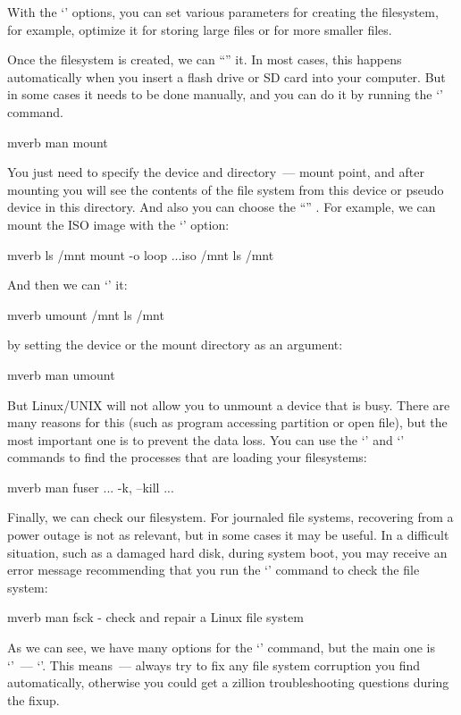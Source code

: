With the `' options, you can set various parameters for creating
the filesystem, for example, optimize it for storing large files or for more
smaller files.

Once the filesystem is created, we can ``'' it. In most cases,
this happens automatically when you insert a flash drive or SD card into
your computer. But in some cases it needs to be done manually, and you can do
it by running the `' command.
\begin{code}{mverb}
man mount
\end{code}
You just need to specify the device and directory~--- mount point, and
after mounting you will see the contents of the file system from this
device or pseudo device in this directory. And also you can choose
the ``'' . For example, we can mount
the ISO image with the `' option:
\begin{code}{mverb}
ls /mnt
mount -o loop ...iso /mnt
ls /mnt
\end{code}
And then we can `' it:
\begin{code}{mverb}
umount /mnt
ls /mnt
\end{code}
by setting the device or the mount directory as an argument:
\begin{code}{mverb}
man umount
\end{code}
But Linux/UNIX will not allow you to unmount a device that is busy.
There are many reasons for this (such as program accessing partition or
open file), but the most important one is to prevent the data loss.
You can use the `' and `' commands to find
the processes that are loading your filesystems:
\begin{code}{mverb}
man fuser
...
-k, --kill
...
\end{code}

Finally, we can check our filesystem. For journaled file systems, recovering
from a power outage is not as relevant, but in some cases it may be useful.
In a difficult situation, such as a damaged hard disk, during system boot,
you may receive an error message recommending that you run
the `' command to check the file system:
\begin{code}{mverb}
man fsck - check and repair a Linux file system
\end{code}
As we can see, we have many options for the `' command, but the main
one is `'~--- `'. This means~--- always try to fix any file
system corruption you find automatically, otherwise you could get a zillion
troubleshooting questions during the fixup.

